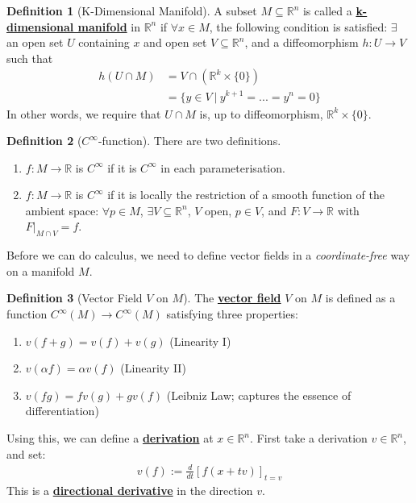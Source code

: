 \documentclass[11pt]{scrartcl}
\newcommand{\R}[0]{\mathbb{R}}
\theoremstyle{definition}
\newtheorem{definition}{Definition}
\theoremstyle{remark}
\newcommand{\dfn}[1]{\textbf{\underline{#1}}}
\begin{document}
{\begin{definition}[K-Dimensional Manifold]
	A subset $M \subseteq \R^n$ is called a \dfn{k-dimensional manifold} in $\R^n$ if $\forall x \in M$, the following condition is satisfied: $\exists$ an open set $U$ containing $x$ and open set $V \subseteq \R^n$, and a diffeomorphism $h: U \rightarrow V$ such that 
	\begin{align*}
		h (U \cap M) & = V \cap (\R^k \times \{ 0 \} ) \\
					& = \{ y \in V\ |\ y^{k+1} = ... = y^n = 0 \} 
	\end{align*}
	In other words, we require that $U \cap M$ is, up to diffeomorphism, $\R^k \times \{ 0 \}$. 
\end{definition}

\begin{definition}[$C^\infty$-function] There are two definitions. 
	\begin{enumerate}[noitemsep] 
		\item $f: M \rightarrow \R$ is $C^\infty$ if it is $C^\infty$ in each parameterisation. 
		\item $f: M \rightarrow \R$ is $C^\infty$ if it is locally the restriction of a smooth function of the ambient space: $\forall p \in M$, $\exists V \subseteq \R^n$, $V$ open, $ p \in V$, and $F: V \rightarrow \R$ with $F|_{M \cap V} = f$. 
	\end{enumerate}
\end{definition}

Before we can do calculus, we need to define vector fields in a \emph{coordinate-free} way on a manifold $M$. 

\begin{definition}[Vector Field $V$ on $M$]
	The \dfn{vector field} $V$ on $M$ is defined as a function $C^\infty(M) \rightarrow C^\infty(M)$ satisfying three properties: 
	\begin{enumerate}[noitemsep]
		\item $v(f+g) = v(f) + v(g) $ (Linearity I) 
		\item $v (\alpha f) = \alpha v(f) $ (Linearity II) 
		\item $v(fg) = fv(g) + gv(f)$ (Leibniz Law; captures the essence of differentiation)
	\end{enumerate}
\end{definition}

Using this, we can define a \dfn{derivation} at $x \in \R^n$. First take a derivation $v \in \R^n$, and set: 
\begin{align}
	v(f) := \frac{d}{dt} \left[ f(x+tv) \right]_{t =v} 	
\end{align}
This is a \dfn{directional derivative} in the direction $v$. 

}
\end{document}
